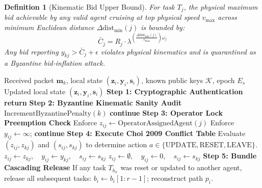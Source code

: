 \documentclass[journal,10pt,twocolumn]{IEEEtran}
\newtheorem{definition}{Definition}
\begin{document}
\begin{definition}[Kinematic Bid Upper Bound]
For task $T_j$, the physical maximum bid achievable by any valid agent cruising at top physical speed $v_{\max}$ across minimum Euclidean distance $\Delta \text{dist}_{\min}(j)$ is bounded by:
\begin{equation}
\bar{C}_j = R_j \cdot \lambda^{\left(\frac{\Delta \text{dist}_{\min}(j)}{v_{\max}}\right) \omega_j}
\end{equation}
Any bid reporting $y_{kj} > \bar{C}_j + \epsilon$ violates physical kinematics and is quarantined as a Byzantine bid-inflation attack.
\end{definition}

\begin{algorithm}[t]
\caption{BFT-CBBA Phase 2: Byzantine-Filtered Consensus}
\label{alg:bft_consensus}
\begin{algorithmic}[1]
\Require Received packet $\mathbf{m}_k$, local state $(\mathbf{z}_i, \mathbf{y}_i, \mathbf{s}_i)$, known public keys $\mathcal{K}$, epoch $E_s$
\Ensure Updated local state $(\mathbf{z}_i, \mathbf{y}_i, \mathbf{s}_i)$
\State \textbf{Step 1: Cryptographic Authentication}
    \State \textbf{return} 
\EndIf
{}
    \State \textbf{Step 2: Byzantine Kinematic Sanity Audit}
        \State $\text{IncrementByzantinePenalty}(k)$
        \State \textbf{continue} 
    \EndIf
    \State \textbf{Step 3: Operator Lock Preemption Check}
        \State Enforce $z_{ij} \gets \text{OperatorAssignedAgent}(j)$
        \State Enforce $y_{ij} \gets \infty$; \textbf{continue}
    \EndIf
    \State \textbf{Step 4: Execute Choi 2009 Conflict Table}
    \State Evaluate $(z_{ij}, z_{kj})$ and $(s_{ij}, s_{kj})$ to determine action $a \in \{\text{UPDATE}, \text{RESET}, \text{LEAVE}\}$.
        \State $z_{ij} \gets z_{kj}, \quad y_{ij} \gets y_{kj}, \quad s_{ij} \gets s_{kj}$
        \State $z_{ij} \gets \emptyset, \quad y_{ij} \gets 0, \quad s_{ij} \gets s_{kj}$
    \EndIf
\EndFor
\State \textbf{Step 5: Bundle Cascading Release}
\State If any task $T_{b_{ir}}$ was reset or updated to another agent, release all subsequent tasks:
\State $b_i \gets b_i[1 : r-1]$; reconstruct path $p_i$.
\end{algorithmic}
\end{algorithm}
\end{document}

